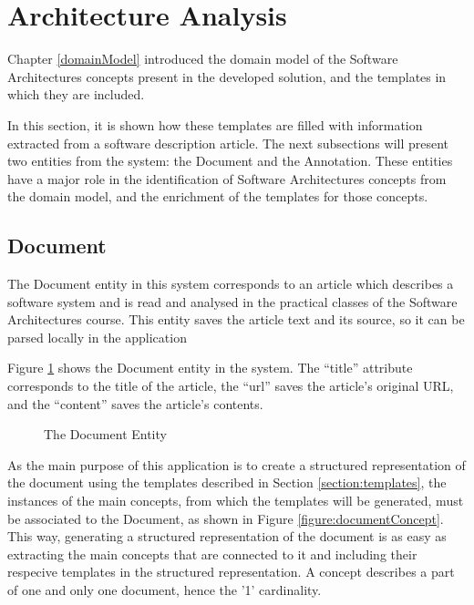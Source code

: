 \documentclass{llncs}
\begin{document}
\section{Architecture Analysis}
\label{architecture}
Chapter \ref{domainModel} introduced the domain model of the Software Architectures concepts present in the developed solution, and the templates in which they are included.

In this section, it is shown how these templates are filled with information extracted from a software description article. The next subsections will present two entities from the system: the Document and the Annotation. These entities have a major role in the identification of Software Architectures concepts from the domain model, and the enrichment of the templates for those concepts.

\subsection{Document}
\label{section:document}

The Document entity in this system corresponds to an article which describes a software system and is read and analysed in the practical classes of the Software Architectures course. This entity saves the article text and its source, so it can be parsed locally in the application

Figure \ref{figure:documentEntity} shows the Document entity in the system. The ``title'' attribute corresponds to the title of the article, the ``url'' saves the article's original URL, and the ``content'' saves the article's contents.

\begin{figure}
\centering
\renewcommand {\umltextcolor}{black}
\renewcommand {\umlfillcolor}{none}
\renewcommand {\umldrawcolor}{black}

\caption{The Document Entity}
\label{figure:documentEntity}
\end{figure}

As the main purpose of this application is to create a structured representation of the document using the templates described in Section \ref{section:templates}, the instances of the main concepts, from which the templates will be generated, must be associated to the Document, as shown in Figure \ref{figure:documentConcept}. This way, generating a structured representation of the document is as easy as extracting the main concepts that are connected to it and including their respecive templates in the structured representation. A concept describes a part of one and only one document, hence the '1' cardinality.  
\end{document}
